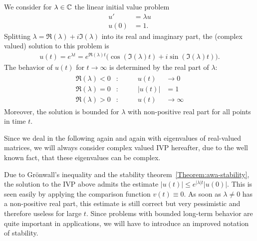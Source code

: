 \begin{example}
  \label{ex:linear-model}
  We consider for $\lambda \in \mathbb C$ the linear initial value problem
  \begin{equation}
    \begin{split}
      \label{eq:impl:testproblem}
      u' & = \lambda u\\
      u(0) & = 1.
    \end{split}
  \end{equation}
  Splitting $\lambda=\Re(\lambda)+i\Im(\lambda)$ into its real and
  imaginary part, the (complex valued) solution to this problem is
  \begin{gather*}
     u(t) = e^{\lambda t}
     = e^{\Re(\lambda)t}\bigl(
     \cos(\Im(\lambda)t)+i\sin(\Im(\lambda)t)
     \bigr).
  \end{gather*}
  The behavior of $u(t)$ for $t\to\infty$ is determined by the real
  part of $\lambda$:
  \begin{gather}
    \label{eq:impl:cases}
    \begin{aligned}
      \Re(\lambda) < 0 & :\qquad& u(t) &\to 0 \\
      \Re(\lambda) = 0 & :\qquad& |u(t)| &= 1 \\
      \Re(\lambda) > 0 & :\qquad& u(t) &\to \infty
    \end{aligned}
  \end{gather}
  Moreover, the solution is bounded for $\lambda$ with non-positive
  real part for all points in time $t$.
\end{example}

\begin{remark}
  Since we deal in the following again and again with eigenvalues of
  real-valued matrices, we will always consider complex valued IVP
  hereafter, due to the well known fact, that these eigenvalues can be
  complex.
\end{remark}

\begin{remark}  
  Due to Grönwall's inequality and the stability
  theorem~\ref{Theorem:awa-stability}, the solution to the IVP above
  admits the estimate $|u(t)| \le e^{|\lambda|t} |u(0)|$.  This is
  seen easily by applying the comparison function $v(t) \equiv 0$.  As
  soon as $\lambda \neq 0$ has a non-positive real part, this estimate
  is still correct but very pessimistic and therefore useless for
  large $t$.  Since problems with bounded long-term behavior are quite
  important in applications, we will have to introduce an improved
  notation of stability.
\end{remark}

